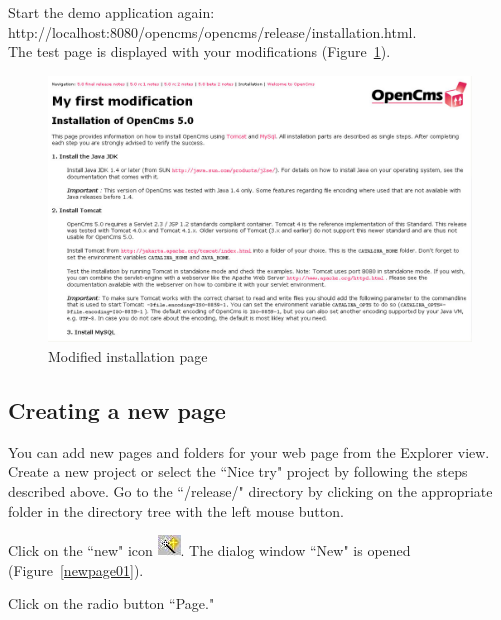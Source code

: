 Start the demo application again:\\
http://localhost:8080/opencms/opencms/release/installation.html.\\
The test page is displayed with your modifications (Figure~\ref{demopage02}).

\begin{figure}[!hbt]
\begin{center}
\includegraphics[width=\sgw]
                   {pics/usermanual/demoPage02}
\caption[Modified installation page]
           {Modified installation page}
\label{demopage02}
\end{center}
\end{figure}


\subsection{Creating a new page}

You can add new pages and folders for your web page from the
Explorer view. Create a new project or select the ``Nice try" project by following the steps
described above. Go to the ``/release/" directory by clicking on the
appropriate folder in the directory tree with the left mouse
button.

Click on the ``new" icon
\includegraphics{pics/usermanual/ic_newres}. The dialog window
``New" is opened (Figure~\ref{newpage01}).

Click on the radio button ``Page."

